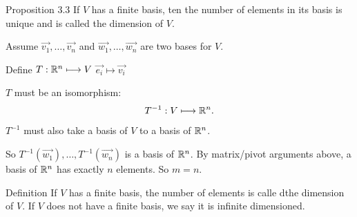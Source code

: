 \proposition{}
Proposition 3.3
If $V$ has a finite basis, ten the number of elements in its basis is unique and is called the dimension of $V$.

\proof{}
Assume ${\vec{v_1},\ldots,\vec{v_n}}$ and ${\vec{w_1},\ldots,\vec{w_n}}$ are two bases for $V$.

Define  $T:\mathbb{R}^{n}\longmapsto V$ 
$\vec{e_i}\longmapsto \vec{v_i}$

$T$ must be an isomorphism:
\[
  T^{-1}:V \longmapsto \mathbb{R}^{n} 
.\] 

$T^{-1}$ must also take a basis of $V$ to a basis of $\mathbb{R}^{n}$.

So ${T^{-1}(\vec{w_1}),\ldots,T^{-1}(\vec{w_n})}$ is a basis of $\mathbb{R}^{n}$. By matrix/pivot arguments above, a basis of $\mathbb{R}^{n}$ has exactly $n$ elements. So $m=n$.

Definition
If $V$ has a finite basis, the number of elements is calle dthe dimension of  $V$. If  $V$ does not have a finite basis, we say it is infinite dimensioned.

$  $
